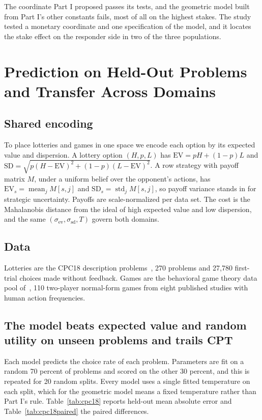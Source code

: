 \documentclass[journal]{IEEEtran}
\begin{document}
The coordinate Part I proposed passes its tests, and the geometric model built from Part I's other constants fails, most of all on the highest stakes.
The study tested a monetary coordinate and one specification of the model, and it locates the stake effect on the responder side in two of the three populations.

\section{Prediction on Held-Out Problems and Transfer Across Domains}
\label{sec:transfer}

\subsection{Shared encoding}
To place lotteries and games in one space we encode each option by its expected value and dispersion.
A lottery option $(H,p,L)$ has $\mathrm{EV}=pH+(1-p)L$ and $\mathrm{SD}=\sqrt{p(H-\mathrm{EV})^2+(1-p)(L-\mathrm{EV})^2}$.
A row strategy with payoff matrix $M$, under a uniform belief over the opponent's actions, has $\mathrm{EV}_s=\operatorname{mean}_j M[s,j]$ and $\mathrm{SD}_s=\operatorname{std}_j M[s,j]$, so payoff variance stands in for strategic uncertainty.
Payoffs are scale-normalized per data set.
The cost is the Mahalanobis distance from the ideal of high expected value and low dispersion, and the same $(\sigma_{\mathrm{ev}},\sigma_{\mathrm{sd}},T)$ govern both domains.

\subsection{Data}
Lotteries are the CPC18 description problems~\cite{erev2017,cpc18data}, 270 problems and 27{,}780 first-trial choices made without feedback.
Games are the behavioral game theory data pool of~\cite{wright2017}, 110 two-player normal-form games from eight published studies with human action frequencies.

\subsection{The model beats expected value and random utility on unseen problems and trails CPT}
Each model predicts the choice rate of each problem.
Parameters are fit on a random 70 percent of problems and scored on the other 30 percent, and this is repeated for 20 random splits.
Every model uses a single fitted temperature on each split, which for the geometric model means a fixed temperature rather than Part I's rule.
Table~\ref{tab:cpc18} reports held-out mean absolute error and Table~\ref{tab:cpc18paired} the paired differences.
\end{document}
